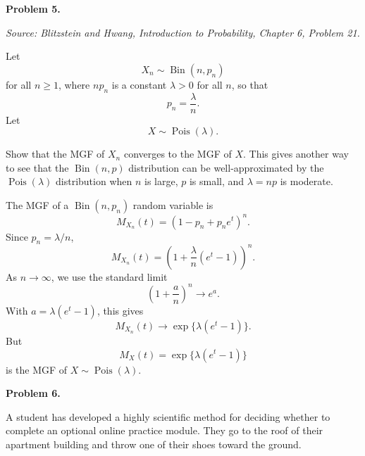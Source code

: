 \documentclass[11pt]{article}
\newcommand{\source}[2]{%
    \vspace{0.15cm}
    {\small\textit{Source: Blitzstein and Hwang, \textit{Introduction to Probability}, Chapter #1, Problem #2.}}
}
\begin{document}
 

 

 


\begin{problemheader}
\textbf{Problem 5. }
\end{problemheader}
\source{6}{21}

Let
\[
X_n\sim\operatorname{Bin}(n,p_n)
\]
for all $n\ge1$, where $np_n$ is a constant $\lambda>0$ for all $n$, so that
\[
p_n=\frac{\lambda}{n}.
\]
Let
\[
X\sim\operatorname{Pois}(\lambda).
\]

Show that the MGF of $X_n$ converges to the MGF of $X$. This gives another way to see that the $\operatorname{Bin}(n,p)$ distribution can be well-approximated by the $\operatorname{Pois}(\lambda)$ distribution when $n$ is large, $p$ is small, and $\lambda=np$ is moderate.

\begin{solutionbox}
The MGF of a $\operatorname{Bin}(n,p_n)$ random variable is
\[
M_{X_n}(t)=\left(1-p_n+p_ne^t\right)^n.
\]
Since $p_n=\lambda/n$,
\[
M_{X_n}(t)
=
\left(1+\frac{\lambda}{n}(e^t-1)\right)^n.
\]
As $n\to\infty$, we use the standard limit
\[
\left(1+\frac{a}{n}\right)^n\to e^a.
\]
With $a=\lambda(e^t-1)$, this gives
\[
M_{X_n}(t)
\to
\exp\{\lambda(e^t-1)\}.
\]
But
\[
M_X(t)=\exp\{\lambda(e^t-1)\}
\]
is the MGF of $X\sim\operatorname{Pois}(\lambda)$.

 
\end{solutionbox}
\newpage








 

\begin{problemheader}
\textbf{Problem 6. }
\end{problemheader}

A student has developed a highly scientific method for deciding whether to
complete an optional online practice module. They go to the roof of their
apartment building and throw one of their shoes toward the ground.
\end{document}
